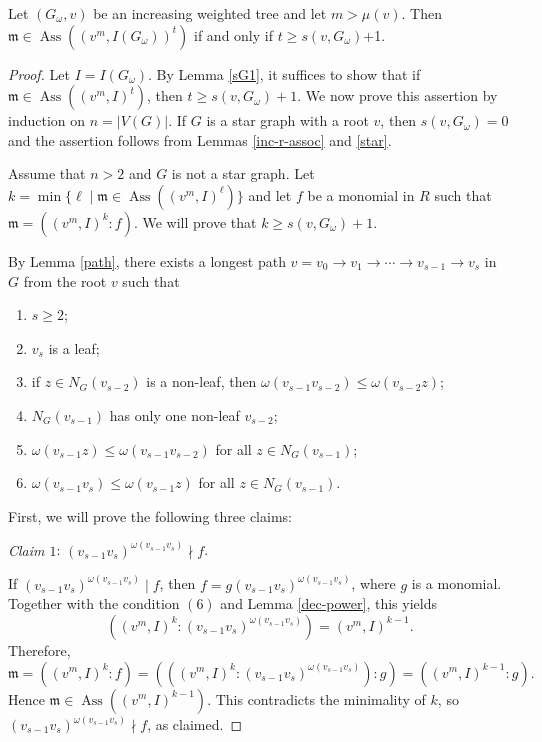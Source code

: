 \documentclass[10pt,a4paper]{amsart}
\DeclareMathOperator{\ass}{Ass}
\def\m {\mathfrak m}
\begin{document}
\begin{lem} \label{sG2} Let $(G_\omega,v)$ be an increasing weighted tree and let $m > \mu(v)$. Then $\m\in \ass((v^m,I(G_\omega))^t)$ if and only if $t\geqslant s(v,G_\omega)$+1.
\end{lem}

\begin{proof} Let $I=I(G_\omega)$. By Lemma \ref{sG1}, it suffices to show that if $\m\in\ass((v^m,I)^t)$, then $t\geqslant s(v,G_{\omega})+1$. 
 We now prove this assertion by induction on $n=|V(G)|$. 
 If  $G$ is a star graph with a root  $v$, then  $s(v,G_\omega)=0$ and the assertion follows from Lemmas \ref{inc-r-assoc} and  \ref{star}.
 
 Assume that $n > 2$ and $G$ is not a star graph. Let $k=\min\{\ell\mid \m\in \ass((v^m,I)^{\ell})\}$ and let $f$ be a monomial in $R$ such that $\m = ((v^m,I)^k \colon f)$. 
We will prove that $k\geqslant s(v,G_\omega)+1$.

By Lemma \ref{path},  there exists a longest path $v= v_0\to v_1\to\cdots\to v_{s-1}\to v_s$ in $G$ from the root $v$ such that 
\begin{enumerate}
	\item $s\geqslant 2$;
	\item $v_s$ is a leaf;
	\item if $z\in N_G(v_{s-2})$ is a non-leaf, then $\omega(v_{s-1}v_{s-2})\leqslant \omega(v_{s-2}z)$;
	\item $N_G(v_{s-1})$ has only one non-leaf $v_{s-2}$;
	\item $\omega(v_{s-1}z) \leqslant \omega(v_{s-1}v_{s-2})$ for all $z\in N_G(v_{s-1})$;
	\item $\omega(v_{s-1}v_s) \leqslant \omega(v_{s-1}z)$ for all $z\in N_G(v_{s-1})$.
\end{enumerate}
First, we will prove the following  three  claims:

{\it Claim $1$}: $(v_{s-1}v_{s})^{\omega(v_{s-1}v_{s})} \nmid f$. 

If $(v_{s-1}v_{s})^{\omega(v_{s-1}v_{s})} \mid f$, then $f = g(v_{s-1}v_{s})^{\omega(v_{s-1}v_{s})}$, where $g$ is a monomial. Together with the condition  $(6)$ and  Lemma \ref{dec-power},   this yields
\[
((v^m,I)^k \colon (v_{s-1}v_{s})^{\omega(v_{s-1}v_{s})}) = (v^m,I)^{k-1}.
\]
Therefore,
$$\m = ((v^m,I)^k \colon f) = (((v^m,I)^k\colon (v_{s-1}v_{s})^{\omega(v_{s-1}v_{s})})\colon g) = ((v^m,I)^{k-1}\colon g).$$
Hence $\m\in \ass((v^m,I)^{k-1})$. This contradicts the minimality of $k$, so  $(v_{s-1}v_{s})^{\omega(v_{s-1}v_{s})}\nmid f$, as claimed.



\end{proof}
\end{document}
